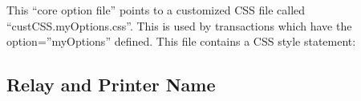 \documentclass[letterpaper,10pt,english]{sphinxmanual}
\begin{document}

This “core option file” points to a customized CSS file called “custCSS.myOptions.css”. This is used by transactions which have the option=”myOptions” defined. This file contains a CSS style statement:

\begin{sphinxVerbatim}[commandchars=\\\{\}]
\end{sphinxVerbatim}


\ignorespaces 

\subsection{Relay and Printer Name}
\label{\detokenize{Customization:relay-and-printer-name}}\label{\detokenize{Customization:index-43}}
\ignorespaces 
\end{document}
